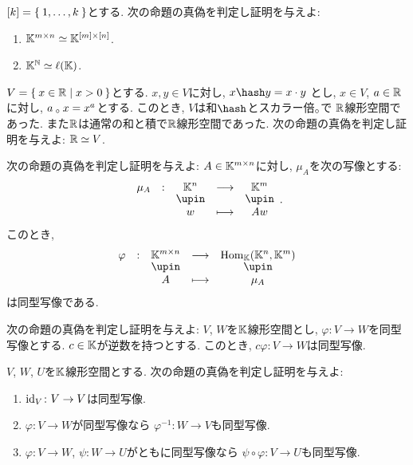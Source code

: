 \begin{quiz}
  $[k]=\Set{1,\ldots,k}$とする.
  次の命題の真偽を判定し証明を与えよ:
  \begin{enumerate}
  \item
    $\mathbb{K}^{m\times n}\simeq \mathbb{K}^{[m]\times [n]}$.
  \item
    $\mathbb{K}^{\mathbb{N}}\simeq \ell(\mathbb{K})$.
  \end{enumerate}
\end{quiz}

\begin{quiz}
  $V=\Set{x\in\mathbb{R}|x>0}$とする.
  $x,y\in V$に対し,
  $x \pplus y =x\cdot y$
  とし,
  $x\in V$, $a\in \mathbb{R}$に対し,
  $a\mathbin{{}_\circ} x=x^a$とする.
  このとき,
  $V$は和$\pplus$とスカラー倍$\mathbin{{}_\circ}$で
  $\mathbb{R}$線形空間であった.
  また$\mathbb{R}$は通常の和と積で$\mathbb{R}$線形空間であった.
  次の命題の真偽を判定し証明を与えよ:
  $\mathbb{R}\simeq V$.
\end{quiz}

\begin{quiz}
  次の命題の真偽を判定し証明を与えよ:
  $A\in \mathbb{K}^{m\times n}$に対し,
  $\mu_A$を次の写像とする:
  \begin{align*}
    \shazo{\mu_A}{\KK^n}{\KK^m}{w}{Aw}.
  \end{align*}
  このとき,
  \begin{align*}
    \shazo{\varphi}{\KK^{m\times n}}{\Hom_{\KK}(\KK^n,\KK^m)}
    {A}{\mu_A}
  \end{align*}
  は同型写像である.
\end{quiz}

\begin{quiz}
  次の命題の真偽を判定し証明を与えよ:
  $V$, $W$を$\mathbb{K}$線形空間とし,
  $\varphi\colon V\to W$を同型写像とする.
  $c\in\mathbb{K}$が逆数を持つとする.
  このとき,
  $c\varphi\colon V\to W$は同型写像.
\end{quiz}

\begin{quiz}
  $V$, $W$, $U$を$\mathbb{K}$線形空間とする.
  次の命題の真偽を判定し証明を与えよ:
  \begin{enumerate}
  \item
    $\operatorname{id}_V\colon V\to V$は同型写像.
  \item
    $\varphi\colon V\to W$が同型写像なら
    $\varphi^{-1}\colon W\to V$も同型写像.
  \item
    $\varphi\colon V\to W$, $\psi\colon W \to U$がともに同型写像なら
    $\psi\circ\varphi\colon V\to U$も同型写像.
  \end{enumerate}
\end{quiz}




